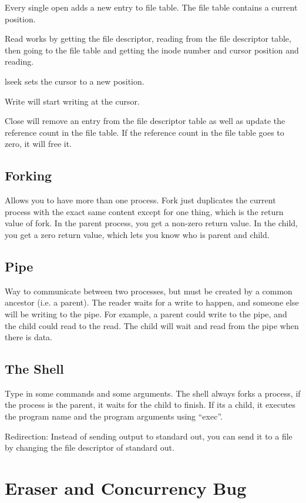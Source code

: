\documentclass[psamsfonts]{amsart}
\begin{document}
Every single open adds a new entry to file table. The file table contains a current position.

Read works by getting the file descriptor, reading from the file descriptor table, then going to the file table and getting the inode number and cursor position and reading.

lseek sets the cursor to a new position.

Write will start writing at the cursor.

Close will remove an entry from the file descriptor table as well as update the reference count in the file table. If the reference count in the file table goes to zero, it will free it.

\subsection{Forking}

Allows you to have more than one process. Fork just duplicates the current process with the exact same content except for one thing, which is the return value of fork. In the parent process, you get a non-zero return value. In the child, you get a zero return value, which lets you know who is parent and child.

\subsection{Pipe}

Way to communicate between two processes, but must be created by a common ancestor (i.e. a parent). The reader waits for a write to happen, and someone else will be writing to the pipe. For example, a parent could write to the pipe, and the child could read to the read. The child will wait and read from the pipe when there is data.

\subsection{The Shell}

Type in some commands and some arguments. The shell always forks a process, if the process is the parent, it waits for the child to finish. If its a child, it executes the program name and the program arguments using ``exec''. 

Redirection: Instead of sending output to standard out, you can send it to a file by changing the file descriptor of standard out.

\section{Eraser and Concurrency Bug}
\end{document}
